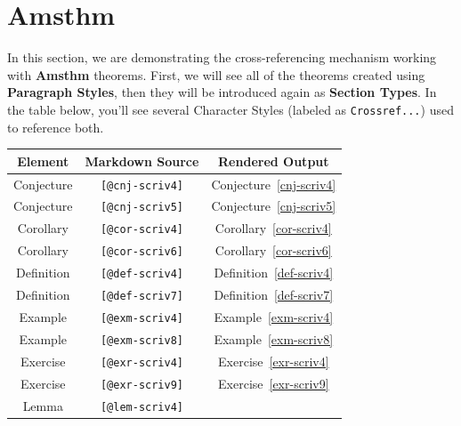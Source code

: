 \documentclass[
  12pt,
  a4paper,
  oneside,
  titlepage,
  toclink=all,
  toc=bibliography]{scrbook}
\theoremstyle{definition}
\theoremstyle{plain}
\theoremstyle{plain}
\theoremstyle{plain}
\theoremstyle{plain}
\theoremstyle{definition}
\theoremstyle{definition}
\theoremstyle{plain}
\theoremstyle{remark}
\begin{document}
\hypertarget{sec-scriv4}{%
\section{Amsthm}\label{sec-scriv4}}

\protect\hypertarget{scriv4}{}{}

In this section, we are demonstrating the cross-referencing mechanism
working with \textbf{Amsthm} theorems. First, we will see all of the
theorems created using \textbf{Paragraph Styles}, then they will be
introduced again as \textbf{Section Types}. In the table below, you'll
see several Character Styles (labeled as \texttt{Crossref...}) used to
reference both.

\begin{longtable}[]{@{}ccc@{}}
\toprule\noalign{}
\textbf{Element} & \textbf{Markdown Source} & \textbf{Rendered
Output} \\
\midrule\noalign{}
\endhead
\bottomrule\noalign{}
\endlastfoot
Conjecture & \texttt{{[}@cnj-scriv4{]}} &
\protect\hypertarget{cite_8}{}{\label{cite_8}Conjecture~\ref{cnj-scriv4}} \\
Conjecture & \texttt{{[}@cnj-scriv5{]}} &
\protect\hypertarget{cite_9}{}{\label{cite_9}Conjecture~\ref{cnj-scriv5}} \\
Corollary & \texttt{{[}@cor-scriv4{]}} &
\protect\hypertarget{cite_10}{}{\label{cite_10}Corollary~\ref{cor-scriv4}} \\
Corollary & \texttt{{[}@cor-scriv6{]}} &
\protect\hypertarget{cite_11}{}{\label{cite_11}Corollary~\ref{cor-scriv6}} \\
Definition & \texttt{{[}@def-scriv4{]}} &
\protect\hypertarget{cite_12}{}{\label{cite_12}Definition~\ref{def-scriv4}} \\
Definition & \texttt{{[}@def-scriv7{]}} &
\protect\hypertarget{cite_13}{}{\label{cite_13}Definition~\ref{def-scriv7}} \\
Example & \texttt{{[}@exm-scriv4{]}} &
\protect\hypertarget{cite_14}{}{\label{cite_14}Example~\ref{exm-scriv4}} \\
Example & \texttt{{[}@exm-scriv8{]}} &
\protect\hypertarget{cite_15}{}{\label{cite_15}Example~\ref{exm-scriv8}} \\
Exercise & \texttt{{[}@exr-scriv4{]}} &
\protect\hypertarget{cite_16}{}{\label{cite_16}Exercise~\ref{exr-scriv4}} \\
Exercise & \texttt{{[}@exr-scriv9{]}} &
\protect\hypertarget{cite_17}{}{\label{cite_17}Exercise~\ref{exr-scriv9}} \\
Lemma & \texttt{{[}@lem-scriv4{]}} &

\end{longtable}
\end{document}
